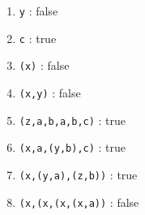 \documentclass[12pt]{article}
\begin{document}
\begin{exe}
\begin{xlist}
{\begin{soln}
\begin{enumerate}
\item {\tt y} : false
\item {\tt c} : true
\item {\tt (x)} : false
\item {\tt (x,y)} : false
\item {\tt (z,a,b,a,b,c)} : true
\item {\tt (x,a,(y,b),c)} : true
\item {\tt (x,(y,a),(z,b))} : true
\item {\tt (x,(x,(x,(x,a))} : false
\end{enumerate}
\end{soln}

}

\begin{comment}
\ex{\label{tree3} Write down the leftmost derivation for the string {\tt (x,(y,b))}

\begin{soln}
\begin{eqnarray*}
S' & \Rightarrow & S \Rightarrow (N,C) \Rightarrow (x,C) \Rightarrow (x,S) \Rightarrow (x,(N,C)) \Rightarrow (x,(y,C)) \Rightarrow (x,(y,S)) \\
   & \Rightarrow & (x,(y,T)) \Rightarrow (x,(y,b))
\end{eqnarray*}
\end{soln}
}

\ex{\label{tree4} Write down the rightmost derivation for the string {\tt (x,(y,b))}

\begin{soln}
\begin{eqnarray*}
S' & \Rightarrow & S \Rightarrow (N,C) \Rightarrow (N,S) \Rightarrow (N,(N,C)) \Rightarrow (N,(N,S)) \Rightarrow (N,(N,T)) \\
   & \Rightarrow & (N,(N,b)) \Rightarrow (N,(y,b)) \Rightarrow (x,(y,b))
\end{eqnarray*}
\end{soln}

}

 \ex{\label{tree5} Draw the parse tree produced by $G$ for the string {\tt (x,(y,b))}

\begin{soln}
\begin{verbatim}
 (S' (S \(
        (N x)
        ,
        (C (S \(
              (N y)
              ,
              (C (S (T b)))
              \)))
        \)))
\end{verbatim}


\end{comment}
\end{xlist}
\end{exe}
\end{document}
